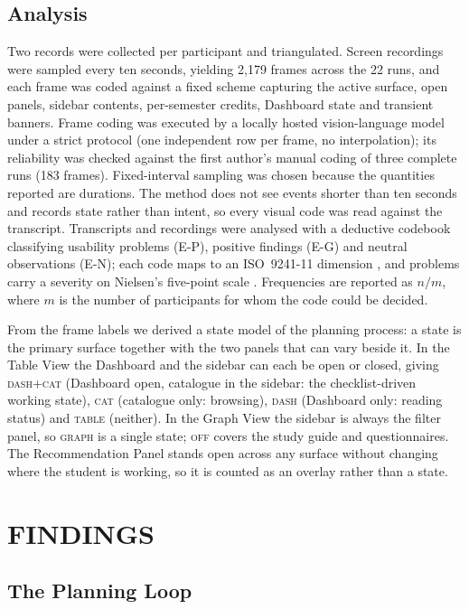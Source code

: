 \documentclass[a4paper,twoside]{article}
\newcommand{\st}[1]{\textsc{#1}}
\begin{document}
\subsection{Analysis}

Two records were collected per participant and triangulated. Screen recordings were sampled every ten seconds, yielding 2,179 frames across the 22 runs, and each frame was coded against a fixed scheme capturing the active surface, open panels, sidebar contents, per-semester credits, Dashboard state and transient banners. Frame coding was executed by a locally hosted vision-language model under a strict protocol (one independent row per frame, no interpolation); its reliability was checked against the first author's manual coding of three complete runs (183 frames). Fixed-interval sampling was chosen because the quantities reported are durations. The method does not see events shorter than ten seconds and records state rather than intent, so every visual code was read against the transcript. Transcripts and recordings were analysed with a deductive codebook classifying usability problems (E-P), positive findings (E-G) and neutral observations (E-N); each code maps to an ISO~9241-11 dimension \cite{iso9241_11}, and problems carry a severity on Nielsen's five-point scale \cite{nielsen1993}. Frequencies are reported as $n/m$, where $m$ is the number of participants for whom the code could be decided.

From the frame labels we derived a state model of the planning process: a state is the primary surface together with the two panels that can vary beside it. In the Table View the Dashboard and the sidebar can each be open or closed, giving \st{dash+cat} (Dashboard open, catalogue in the sidebar: the checklist-driven working state), \st{cat} (catalogue only: browsing), \st{dash} (Dashboard only: reading status) and \st{table} (neither). In the Graph View the sidebar is always the filter panel, so \st{graph} is a single state; \st{off} covers the study guide and questionnaires. The Recommendation Panel stands open across any surface without changing where the student is working, so it is counted as an overlay rather than a state.

\section{\uppercase{Findings}}
\label{sec:findings}

\subsection{The Planning Loop}
\end{document}
